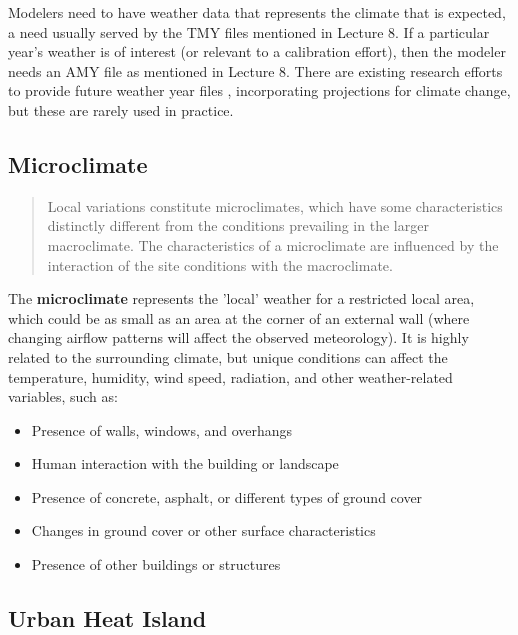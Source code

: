 \documentclass[10pt]{article}
\begin{document}
Modelers need to have weather data that represents the climate that is expected, a need usually served by the TMY files mentioned in Lecture 8. If a particular year's weather is of interest (or relevant to a calibration effort), then the modeler needs an AMY file as mentioned in Lecture 8. There are existing research efforts to provide future weather year files \cite{C_Bianchi_DL_Mendoza_RC_Didier_TD_Tran_AD_Smith2017-uk}, incorporating projections for climate change, but these are rarely used in practice.

\subsection{Microclimate}

\begin{quote}
    Local variations constitute microclimates, which have some characteristics distinctly different from the conditions prevailing in the larger macroclimate. The characteristics of a microclimate are influenced by the interaction of the site conditions with the macroclimate. \cite{Grondzik2014-gt}
\end{quote}

The \textbf{microclimate} represents the 'local' weather for a restricted local area, which could be as small as an area at the corner of an external wall (where changing airflow patterns will affect the observed meteorology). It is highly related to the surrounding climate, but unique conditions can affect the temperature, humidity, wind speed, radiation, and other weather-related variables, such as:

\begin{itemize}
    \setlength{\itemsep}{0pt}%
    \setlength{\parskip}{0pt}%
    \item Presence of walls, windows, and overhangs
    \item Human interaction with the building or landscape
    \item Presence of concrete, asphalt, or different types of ground cover
    \item Changes in ground cover or other surface characteristics
    \item Presence of other buildings or structures
\end{itemize}

\subsection{Urban Heat Island}
\end{document}
